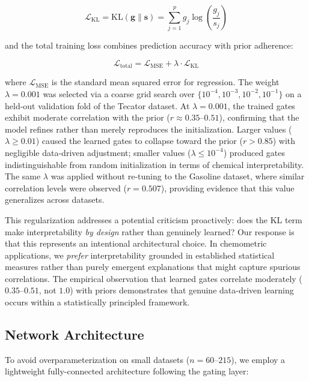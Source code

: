 \documentclass[preprint,12pt]{elsarticle}
\begin{document}
\begin{equation}
\mathcal{L}_{\text{KL}} = \text{KL}(\mathbf{g} \| \mathbf{s}) = \sum_{j=1}^p g_j \log\left(\frac{g_j}{s_j}\right)
\label{eq:kl}
\end{equation}

\noindent and the total training loss combines prediction accuracy with prior adherence:

\begin{equation}
\mathcal{L}_{\text{total}} = \mathcal{L}_{\text{MSE}} + \lambda \cdot \mathcal{L}_{\text{KL}}
\label{eq:loss}
\end{equation}

\noindent where $\mathcal{L}_{\text{MSE}}$ is the standard mean squared error for regression. The weight $\lambda=0.001$ was selected via a coarse grid search over $\{10^{-4}, 10^{-3}, 10^{-2}, 10^{-1}\}$ on a held-out validation fold of the Tecator dataset. At $\lambda=0.001$, the trained gates exhibit moderate correlation with the prior ($r \approx 0.35$--$0.51$), confirming that the model refines rather than merely reproduces the initialization. Larger values ($\lambda \geq 0.01$) caused the learned gates to collapse toward the prior ($r > 0.85$) with negligible data-driven adjustment; smaller values ($\lambda \leq 10^{-4}$) produced gates indistinguishable from random initialization in terms of chemical interpretability. The same $\lambda$ was applied without re-tuning to the Gasoline dataset, where similar correlation levels were observed ($r = 0.507$), providing evidence that this value generalizes across datasets.

This regularization addresses a potential criticism proactively: does the KL term make interpretability {\em by design} rather than genuinely learned? Our response is that this represents an intentional architectural choice. In chemometric applications, we \textit{prefer} interpretability grounded in established statistical measures rather than purely emergent explanations that might capture spurious correlations. The empirical observation that learned gates correlate moderately ($0.35$--$0.51$, not $1.0$) with priors demonstrates that genuine data-driven learning occurs within a statistically principled framework.

\subsection{Network Architecture}

To avoid overparameterization on small datasets ($n=60$--$215$), we employ a lightweight fully-connected architecture following the gating layer:
\end{document}
